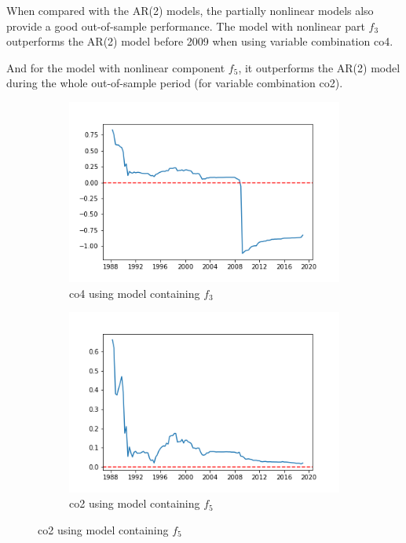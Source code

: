 \documentclass[a4paper,12pt,times,numbered,print,index]{report}
\numberwithin{equation}{section}
\begin{document}
When compared with the AR(2) models, the partially nonlinear models also provide a good out-of-sample performance. The model with nonlinear part $f_3$ outperforms the AR(2) model before 2009 when using variable combination co4.

And for the model with nonlinear component $f_5$, it outperforms the AR(2) model during the whole out-of-sample period (for variable combination co2). 

\begin{figure}[!htbp]
	\centering
	\caption{OOS Performance (Benchmark: AR(2) Models)}
	\begin{subfigure}[b]{0.42\linewidth}
		\includegraphics[width=1.2\linewidth]{plots/co4_AR2_g3.png}
		\caption{co4 using model containing $f_3$}
	\end{subfigure}
	\begin{subfigure}[b]{0.42\linewidth}
		\includegraphics[width=1.2\linewidth]{plots/co2_AR2_g5.png}
		\caption{co2 using model containing $f_5$}
	\end{subfigure}
	\label{vsNL}
\end{figure}
\end{document}
